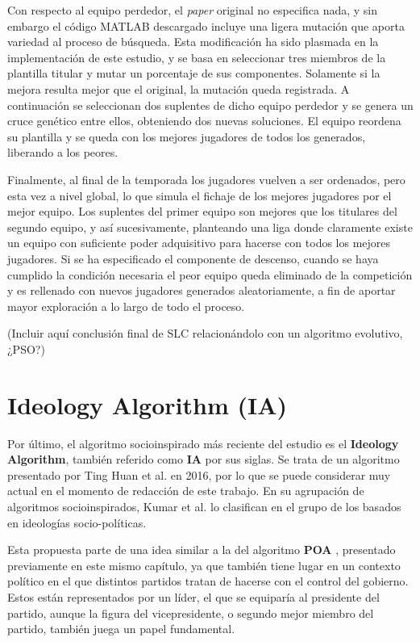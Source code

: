 Con respecto al equipo perdedor, el \textit{paper} original no especifica nada, y sin embargo el código MATLAB descargado \cite{slc-matlab} incluye una ligera mutación que aporta variedad al proceso de búsqueda. Esta modificación ha sido plasmada en la implementación de este estudio, y se basa en seleccionar tres miembros de la plantilla titular y mutar un porcentaje de sus componentes. Solamente si la mejora resulta mejor que el original, la mutación queda registrada. A continuación se seleccionan dos suplentes de dicho equipo perdedor y se genera un cruce genético entre ellos, obteniendo dos nuevas soluciones. El equipo reordena su plantilla y se queda con los mejores jugadores de todos los generados, liberando a los peores.

Finalmente, al final de la temporada los jugadores vuelven a ser ordenados, pero esta vez a nivel global, lo que simula el fichaje de los mejores jugadores por el mejor equipo. Los suplentes del primer equipo son mejores que los titulares del segundo equipo, y así sucesivamente, planteando una liga donde claramente existe un equipo con suficiente poder adquisitivo para hacerse con todos los mejores jugadores. Si se ha especificado el componente de descenso, cuando se haya cumplido la condición necesaria el peor equipo queda eliminado de la competición y es rellenado con nuevos jugadores generados aleatoriamente, a fin de aportar mayor exploración a lo largo de todo el proceso.

(Incluir aquí conclusión final de SLC relacionándolo con un algoritmo evolutivo, ¿PSO?)

\section{Ideology Algorithm (IA)}

Por último, el algoritmo socioinspirado más reciente del estudio es el \textbf{Ideology Algorithm}, también referido como \textbf{IA} por sus siglas. Se trata de un algoritmo presentado por Ting Huan et al. \cite{ia-article} en 2016, por lo que se puede considerar muy actual en el momento de redacción de este trabajo. En su agrupación de algoritmos socioinspirados, Kumar et al. \cite{socio-evolution-algorithm} lo clasifican en el grupo de los basados en ideologías socio-políticas.

Esta propuesta parte de una idea similar a la del algoritmo \textbf{POA} \cite{poa-article}, presentado previamente en este mismo capítulo, ya que también tiene lugar en un contexto político en el que distintos partidos tratan de hacerse con el control del gobierno. Estos están representados por un líder, el que se equiparía al presidente del partido, aunque la figura del vicepresidente, o segundo mejor miembro del partido, también juega un papel fundamental.


